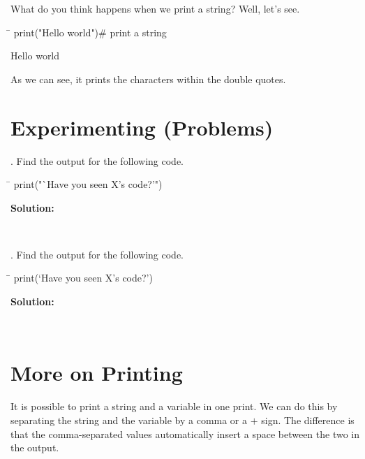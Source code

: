 \documentclass{article}
\begin{document}
What do you think happens when we print a string? Well, let's see.

\begin{tcolorbox}
	\ttfamily
	\begin{tabbing}
		\hspace{3.25 in}\=\hspace{3.25 in} \kill
		print("Hello world")\>\# print a string
	\end{tabbing}
\end{tcolorbox}
\begin{tcolorbox}[colback=output]
	\ttfamily
	Hello world
\end{tcolorbox}
As we can see, it prints the characters within the double quotes.

\newpage
\section{Experimenting (Problems)}
\begin{multicols}{2}
. Find the output for the following code.
\begin{tcolorbox}[width=.5\textwidth]
	\ttfamily
	\begin{tabbing}
		\hspace{3.25 in}\=\hspace{3.25 in} \kill
		print("`Have you seen X's code?'")
	\end{tabbing}
\end{tcolorbox}
\noindent\textbf{Solution:}
\begin{tcolorbox}[colback=output,width=.5\textwidth]
	\ttfamily 
	\phantom{`Have you seen X's code?'}\\
\end{tcolorbox}

. Find the output for the following code.
\begin{tcolorbox}[width=.5\textwidth]
	\ttfamily
	\begin{tabbing}
		\hspace{3.25 in}\=\hspace{3.25 in} \kill
		print(`Have you seen X's code?')
	\end{tabbing}
\end{tcolorbox}
\noindent\textbf{Solution:}
\begin{tcolorbox}[colback=output,width=.5\textwidth]
	\ttfamily 
	\phantom{error}\\
\end{tcolorbox}
\end{multicols}
\section{More on Printing}
It is possible to print a string and a variable in one print. We can do this by separating the string and the variable by a comma or a $+$ sign. The difference is that the comma-separated values automatically insert a space between the two in the output.
\end{document}
